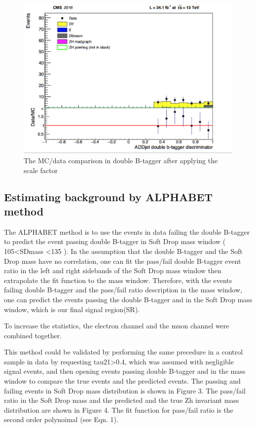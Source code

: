 \documentclass{article}
\begin{document}
\begin{figure}
\includegraphics[width=.7\textwidth]{figures/doubleB_appliedSF.pdf}
\centering
\caption{The MC/data comparison in double B-tagger after applying the scale factor}
\label{pics:blablabla}
\end{figure}



\subsection{Estimating background by ALPHABET method}

The ALPHABET method is to use the events in data failing the double B-tagger to predict the event passing double B-tagger in Soft Drop mass window ( 105\textless SDmass \textless135 ). In the assumption that the double B-tagger and the Soft Drop mass have no correlation, one can fit the pass/fail double B-tagger event ratio in the left and right sidebands of the Soft Drop mass window then extrapolate the fit function to the mass window. Therefore, with the events failing double B-tagger and the pass/fail ratio description in the mass window, one can predict the events passing the double B-tagger and in the Soft Drop mass window, which is our final signal region(SR).    

To increase the statistics, the electron channel and the muon channel were combined together. 

This method could be validated by performing the same precedure in a control sample in data by requesting tau21\textgreater 0.4, which was assumed with negligible signal events, and then opening events passing double B-tagger and in the mass window to compare the true events and the predicted events. The passing and failing events in Soft Drop mass distribution is shown in Figure 3. The pass/fail ratio in the Soft Drop mass and the predicted and the true Zh invariant mass distribution are shown in Figure 4. The fit function for pass/fail ratio is the second order polynoimal (see Eqn. 1).  
\end{document}
